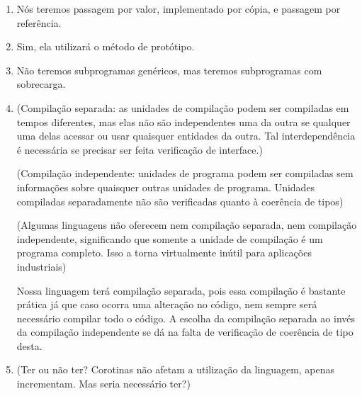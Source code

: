 \documentclass[12pt, a4paper]{article}
\begin{document}
\begin{enumerate}
        \item
        Nós teremos passagem por valor, implementado por cópia, e passagem por referência.

        \item
        Sim, ela utilizará o método de protótipo.

        \item
        Não teremos subprogramas genéricos, mas teremos subprogramas com sobrecarga.

        \begin{comment}
            Com sobrecarga:
            int soma(int a, int b) {
                return a+b;
            }

            float soma(float a, float b) {
                return a+b;
            }

            int soma(String a, String b) {
                return a^b;
            }

            Final das contas, posso lembrar o nome de apenas uma função e fazer:

            soma(1, 2);
            soma(1.5, 2.5);
            soma(“teste”, “ ftw”);

            Sem sobrecarga:

            int somaInt(int a, int b) {
                return a+b;
            }

            float somaFloat(float a, float b) {
                return a+b;
            }

            int somaString(String a, String b) {
                return a^b;
            }
        \end{comment}

        \item
        (Compilação separada: as unidades de compilação podem ser compiladas em tempos diferentes, mas elas não são independentes uma da outra se qualquer uma delas acessar ou usar quaisquer entidades da outra. Tal interdependência é necessária se precisar ser feita verificação de interface.)

        (Compilação independente: unidades de programa podem ser compiladas sem informações sobre quaisquer outras unidades de programa. Unidades compiladas separadamente não são verificadas quanto à coerência de tipos)

        (Algumas linguagens não oferecem nem compilação separada, nem compilação independente, significando que somente a unidade de compilação é um programa completo. Isso a torna virtualmente inútil para aplicações industriais)

        Nossa linguagem terá compilação separada, pois essa compilação é bastante prática já que caso ocorra uma alteração no código, nem sempre será necessário compilar todo o código. A escolha da compilação separada ao invés da compilação independente se dá na falta de verificação de coerência de tipo desta.

        \item
        (Ter ou não ter? Corotinas não afetam a utilização da linguagem, apenas incrementam. Mas seria necessário ter?)

    \end{enumerate}
\end{document}
